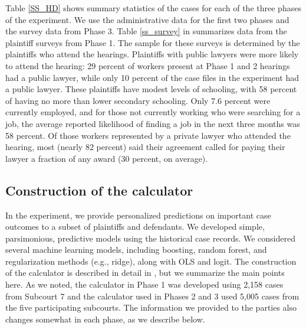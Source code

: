 \documentclass[11pt, a4paper]{article}
\begin{document}
Table \ref{SS_HD} shows summary statistics of the cases for each of the three phases of the experiment. We use the administrative data for the first two phases and the survey data from Phase 3. Table \ref{ss_survey} in  summarizes data from the plaintiff surveys from Phase 1. The sample for these surveys is determined by the plaintiffs who attend the hearings. Plaintiffs with public lawyers were more likely to attend the hearing: 29 percent of workers present at Phase 1 and 2 hearings had a public lawyer, while only 10 percent of the case files in the experiment had a public lawyer. These plaintiffs have modest levels of schooling, with  58 percent of having no more than lower secondary schooling. Only 7.6 percent were currently employed, and for those not currently working who were searching for a job, the average reported likelihood of finding a job in the next three months was 58 percent. Of those workers represented by a private lawyer who attended the hearing, most (nearly 82 percent) said their agreement called for paying their lawyer a fraction of any award (30 percent, on average). 


\subsection{Construction of the calculator}

In the experiment, we provide personalized predictions on important case outcomes to a subset of plaintiffs and defendants. We developed simple, parsimonious, predictive models using the historical case records. We considered several machine learning models, including boosting, random forest, and regularization methods (e.g., ridge), along with OLS and logit. The construction of the calculator is described in detail in , but we summarize the main points here. As we noted, the calculator in Phase 1 was developed using 2,158 cases from Subcourt 7 and the calculator used in Phases 2 and 3 used 5,005 cases from the five participating subcourts. The information we provided to the parties also changes somewhat in each phase, as we describe below.  
\end{document}
